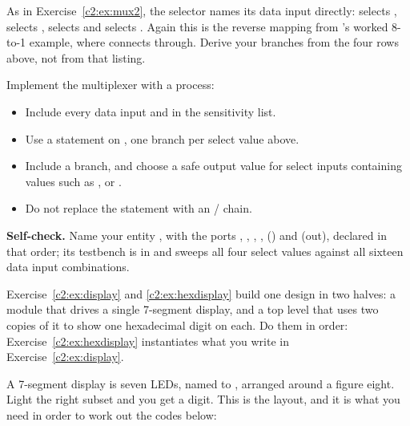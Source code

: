 As in Exercise~\ref{c2:ex:mux2}, the selector names its data input directly:  selects
,  selects ,  selects  and  selects
. Again this is the reverse mapping from 's worked 8-to-1 example,
where  connects  through. Derive your  branches from the four
rows above, not from that listing.

Implement the multiplexer with a process:
\begin{itemize}
  \item Include every data input and  in the sensitivity list.
  \item Use a  statement on , one branch per select value above.
  \item Include a  branch, and choose a safe output value for select inputs
    containing values such as ,  or .
  \item Do not replace the  statement with an / chain.
\end{itemize}


\begin{selfcheck}
\textbf{Self-check.} Name your entity , with the ports , , ,
,  () and  (out), declared in that
order; its testbench is in  and sweeps all four select values against all
sixteen data input combinations.
\end{selfcheck}


Exercise~\ref{c2:ex:display} and \ref{c2:ex:hexdisplay} build one design in two halves: a module
that drives a single 7-segment display, and a top level that uses two copies of it to show one
hexadecimal digit on each. Do them in order: Exercise~\ref{c2:ex:hexdisplay} instantiates what you
write in Exercise~\ref{c2:ex:display}.

A 7-segment display is seven LEDs, named  to , arranged around a figure eight.
Light the right subset and you get a digit. This is the layout, and it is what you need in order to
work out the codes below:

